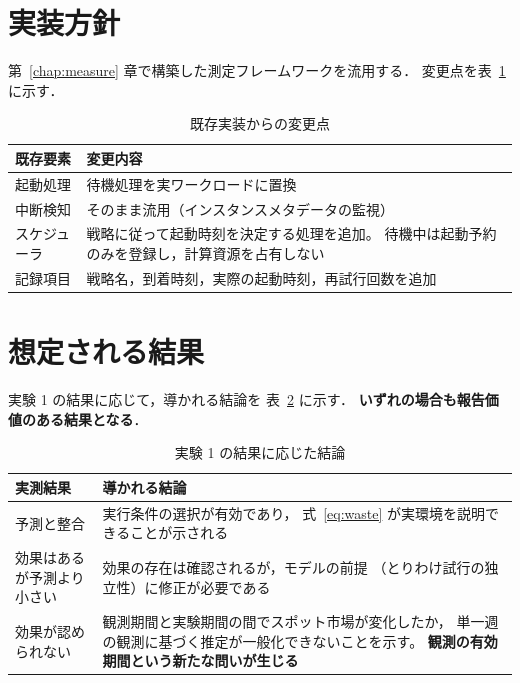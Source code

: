\documentclass[11pt,a4paper]{ltjsreport}
\begin{document}
\section{実装方針}

第~\ref{chap:measure} 章で構築した測定フレームワークを流用する．
変更点を表~\ref{tab:impl} に示す．

\begin{table}[htbp]
\centering
\caption{既存実装からの変更点}
\label{tab:impl}
\small
\begin{tabularx}{\textwidth}{@{}lX@{}}
\toprule
既存要素 & 変更内容 \\
\midrule
起動処理 & 待機処理を実ワークロードに置換 \\
中断検知 & そのまま流用（インスタンスメタデータの監視） \\
スケジューラ & 戦略に従って起動時刻を決定する処理を追加。
               待機中は起動予約のみを登録し，計算資源を占有しない \\
記録項目 & 戦略名，到着時刻，実際の起動時刻，再試行回数を追加 \\
\bottomrule
\end{tabularx}
\end{table}

\section{想定される結果}

実験 1 の結果に応じて，導かれる結論を
表~\ref{tab:outcomes} に示す．
\textbf{いずれの場合も報告価値のある結果となる}．

\begin{table}[htbp]
\centering
\caption{実験 1 の結果に応じた結論}
\label{tab:outcomes}
\small
\begin{tabularx}{\textwidth}{@{}lX@{}}
\toprule
実測結果 & 導かれる結論 \\
\midrule
予測と整合
  & 実行条件の選択が有効であり，
    式~\eqref{eq:waste} が実環境を説明できることが示される \\
\addlinespace
効果はあるが予測より小さい
  & 効果の存在は確認されるが，モデルの前提
    （とりわけ試行の独立性）に修正が必要である \\
\addlinespace
効果が認められない
  & 観測期間と実験期間の間でスポット市場が変化したか，
    単一週の観測に基づく推定が一般化できないことを示す。
    \textbf{観測の有効期間という新たな問いが生じる} \\
\bottomrule
\end{tabularx}
\end{table}
\end{document}
